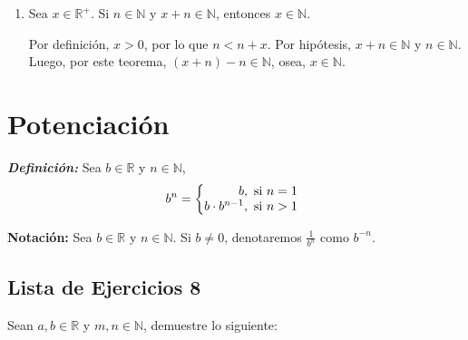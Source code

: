 \documentclass[11pt]{article}
\newcommand{\N}{\mathbb{N}}
\newcommand{\R}{\mathbb{R}}
\newcommand{\bfit}[1]{\textbf{\textit{#1}}}
\begin{document}
\begin{enumerate}[label=\alph*)]
\begin{enumerate}[label=\roman*)]
        \item Sea $x\in \R^+$. Si $n\in \N$ y $x+n\in \N$, entonces $x\in \N$.

        Por definición, $x>0$, por lo que $n<n+x$. Por hipótesis, $x+n\in \N$ y $n\in \N$. Luego, por este teorema, $(x+n)-n \in \N$, osea, $x\in \N$.
    \end{enumerate} %

\end{enumerate}

\section*{Potenciación}

\bfit{Definición:}  Sea $b\in \R$ y $n\in \N$,
    \[
        b^n = \left\{
    \begin{array}{@{}r@{\thinspace}l}
        b, &  \ \text{si}  \ n = 1\\
        b\cdot b^{n-1}, &  \ \text{si}  \ n > 1
    \end{array} \right. \]

\textbf{Notación:} Sea $b\in \R$ y $n\in \N$. Si $b \neq 0$, denotaremos $\frac{1}{b^n}$ como $b^{-n}$.

\subsection*{Lista de Ejercicios 8}

Sean $a, b\in \R$ y $m,n\in \N$, demuestre lo siguiente:
\end{document}
